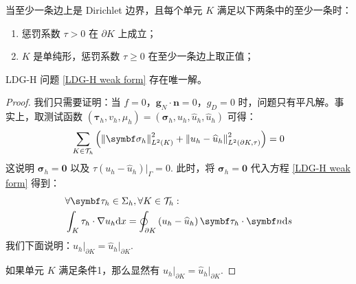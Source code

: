 \begin{theorem}
	当至少一条边上是 Dirichlet 边界，且每个单元 \(K\) 满足以下两条中的至少一条时：
	\begin{enumerate}
		\item 惩罚系数 \(\tau > 0\) 在 \(\partial K\) 上成立；
		\item \(K\) 是单纯形，惩罚系数 \(\tau \geqslant 0\) 在至少一条边上取正值；
	\end{enumerate}
	LDG-H 问题 \eqref{LDG-H weak form} 存在唯一解。

	\begin{proof}
		我们只需要证明：当 \(f = 0\)，\(\bm g_{N} \cdot \bm n = 0\)，\(g_{D} = 0\) 时，问题只有平凡解。事实上，取测试函数 \(\left(\bm\tau_{h}, v_{h}, \mu_{h}\right) = \left(\bm\sigma_{h}, u_{h}, \widehat{u}_{h}, \widehat{u}_{h}\right)\) 可得：
		\begin{equation*}
			\sum_{K \in \mathcal{T}_{h}} \left(\norm{\bm\sigma_{h}}_{L^2(K)}^{2} + \norm{u_{h} - \widehat{u}_{h}}_{L^2(\partial K, \tau)}^{2}\right) = 0
		\end{equation*}
		这说明 \(\bm\sigma_{h} = \bm 0\) 以及 \(\tau(u_{h} - \widehat{u}_{h})\big|_{\Gamma} = 0\). 此时，将 \(\bm\sigma_{h} = \bm 0\) 代入方程 \eqref{LDG-H weak form} 得到：
		\begin{equation*}
			\begin{aligned}
				& \forall \bm\tau_{h} \in \Sigma_{h}, \forall K\in\mathcal{T}_{h}: \\
				& \int_{K} \tau_{h} \cdot \nabla u_{h} \d x = \oint_{\partial K} \left(u_{h} - \widehat{u}_{h}\right) \bm\tau_{h} \cdot \bm n \d s
			\end{aligned}
		\end{equation*}
		我们下面说明：\(u_{h}\big|_{\partial K} = \widehat{u}_{h}\big|_{\partial K}\).

		如果单元 \(K\) 满足条件1，那么显然有 \(u_{h}\big|_{\partial K} = \widehat{u}_{h}\big|_{\partial K}\).


\end{proof}
\end{theorem}

